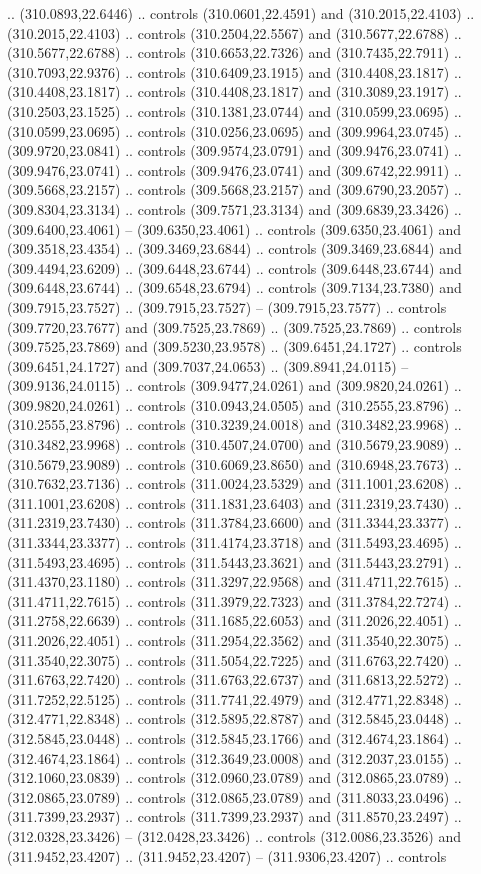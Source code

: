 .. (310.0893,22.6446) .. controls (310.0601,22.4591) and (310.2015,22.4103) .. (310.2015,22.4103) .. controls (310.2504,22.5567) and (310.5677,22.6788) .. (310.5677,22.6788) .. controls (310.6653,22.7326) and (310.7435,22.7911) .. (310.7093,22.9376) .. controls (310.6409,23.1915) and (310.4408,23.1817) .. (310.4408,23.1817) .. controls (310.4408,23.1817) and (310.3089,23.1917) .. (310.2503,23.1525) .. controls (310.1381,23.0744) and (310.0599,23.0695) .. (310.0599,23.0695) .. controls (310.0256,23.0695) and (309.9964,23.0745) .. (309.9720,23.0841) .. controls (309.9574,23.0791) and (309.9476,23.0741) .. (309.9476,23.0741) .. controls (309.9476,23.0741) and (309.6742,22.9911) .. (309.5668,23.2157) .. controls (309.5668,23.2157) and (309.6790,23.2057) .. (309.8304,23.3134) .. controls (309.7571,23.3134) and (309.6839,23.3426) .. (309.6400,23.4061) -- (309.6350,23.4061) .. controls (309.6350,23.4061) and (309.3518,23.4354) .. (309.3469,23.6844) .. controls (309.3469,23.6844) and (309.4494,23.6209) .. (309.6448,23.6744) .. controls (309.6448,23.6744) and (309.6448,23.6744) .. (309.6548,23.6794) .. controls (309.7134,23.7380) and (309.7915,23.7527) .. (309.7915,23.7527) -- (309.7915,23.7577) .. controls (309.7720,23.7677) and (309.7525,23.7869) .. (309.7525,23.7869) .. controls (309.7525,23.7869) and (309.5230,23.9578) .. (309.6451,24.1727) .. controls (309.6451,24.1727) and (309.7037,24.0653) .. (309.8941,24.0115) -- (309.9136,24.0115) .. controls (309.9477,24.0261) and (309.9820,24.0261) .. (309.9820,24.0261) .. controls (310.0943,24.0505) and (310.2555,23.8796) .. (310.2555,23.8796) .. controls (310.3239,24.0018) and (310.3482,23.9968) .. (310.3482,23.9968) .. controls (310.4507,24.0700) and (310.5679,23.9089) .. (310.5679,23.9089) .. controls (310.6069,23.8650) and (310.6948,23.7673) .. (310.7632,23.7136) .. controls (311.0024,23.5329) and (311.1001,23.6208) .. (311.1001,23.6208) .. controls (311.1831,23.6403) and (311.2319,23.7430) .. (311.2319,23.7430) .. controls (311.3784,23.6600) and (311.3344,23.3377) .. (311.3344,23.3377) .. controls (311.4174,23.3718) and (311.5493,23.4695) .. (311.5493,23.4695) .. controls (311.5443,23.3621) and (311.5443,23.2791) .. (311.4370,23.1180) .. controls (311.3297,22.9568) and (311.4711,22.7615) .. (311.4711,22.7615) .. controls (311.3979,22.7323) and (311.3784,22.7274) .. (311.2758,22.6639) .. controls (311.1685,22.6053) and (311.2026,22.4051) .. (311.2026,22.4051) .. controls (311.2954,22.3562) and (311.3540,22.3075) .. (311.3540,22.3075) .. controls (311.5054,22.7225) and (311.6763,22.7420) .. (311.6763,22.7420) .. controls (311.6763,22.6737) and (311.6813,22.5272) .. (311.7252,22.5125) .. controls (311.7741,22.4979) and (312.4771,22.8348) .. (312.4771,22.8348) .. controls (312.5895,22.8787) and (312.5845,23.0448) .. (312.5845,23.0448) .. controls (312.5845,23.1766) and (312.4674,23.1864) .. (312.4674,23.1864) .. controls (312.3649,23.0008) and (312.2037,23.0155) .. (312.1060,23.0839) .. controls (312.0960,23.0789) and (312.0865,23.0789) .. (312.0865,23.0789) .. controls (312.0865,23.0789) and (311.8033,23.0496) .. (311.7399,23.2937) .. controls (311.7399,23.2937) and (311.8570,23.2497) .. (312.0328,23.3426) -- (312.0428,23.3426) .. controls (312.0086,23.3526) and (311.9452,23.4207) .. (311.9452,23.4207) -- (311.9306,23.4207) .. controls 